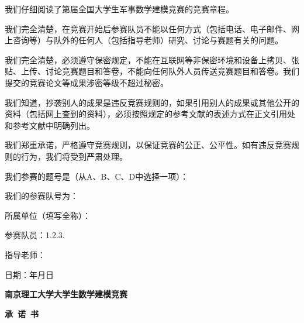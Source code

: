 \begin{spacing}{2.0}
\fangsong
{}

我们仔细阅读了第届全国大学生军事数学建模竞赛的竞赛章程。

我们完全清楚，在竞赛开始后参赛队员不能以任何方式（包括电话、电子邮件、网上咨询等）与队外的任何人（包括指导老师）研究、讨论与赛题有关的问题。

我们完全清楚，必须遵守保密规定，不能在互联网等非保密环境和设备上拷贝、张贴、上传、讨论竞赛题目和答卷，不能向任何队外人员传送竞赛题目和答卷。我们提交的竞赛论文等成果涉密等级不超过秘密。

我们知道，抄袭别人的成果是违反竞赛规则的，如果引用别人的成果或其他公开的资料（包括网上查到的资料），必须按照规定的参考文献的表述方式在正文引用处和参考文献中明确列出。

我们郑重承诺，严格遵守竞赛规则，以保证竞赛的公正、公平性。如有违反竞赛规则的行为，我们将受到严肃处理。

我们参赛的题号是（从A、B、C、D中选择一项）：\NumberProblem

我们的参赛队号为：\NumberMilitaryMathModeling

所属单位（填写全称）：\MembersUniversity

参赛队员：1.\underline{\makebox[8\ccwd][c]{\MemberOne}}2.\underline{\makebox[8\ccwd][c]{\MemberTwo}}3.\underline{\makebox[8\ccwd][c]{\MemberThree}}

指导老师：\underline{\makebox[20\ccwd][c]{\MemberTeacher}}
\end{spacing}

\begin{flushright}
\fangsong
{}

日期：\Year 年\Month 月\Day 日
\end{flushright}

\restoregeometry
\setcounter{page}{1}

\fi


\ifNJUSTMathModeling

\thispagestyle{empty}

\begin{center}
\textbf{\Year 南京理工大学大学生数学建模竞赛}

\vspace{2em}

\textbf{承~诺~书}

\vspace{1em}
\end{center}


